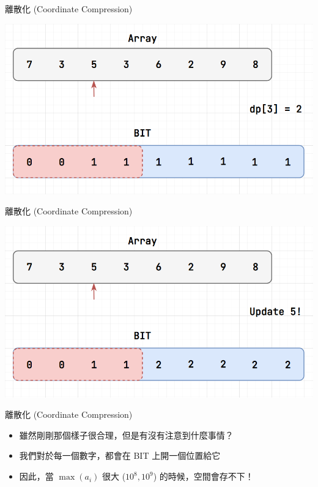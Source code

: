 \documentclass[aspectratio=169]{beamer}
\begin{document}
    \begin{frame}{離散化 (Coordinate Compression)}
        \begin{center}
            \includegraphics[scale=0.45]{LIS/step8.png}
        \end{center}
    \end{frame}

    \begin{frame}{離散化 (Coordinate Compression)}
        \begin{center}
            \includegraphics[scale=0.45]{LIS/step9.png}
        \end{center}
    \end{frame}

    \begin{frame}{離散化 (Coordinate Compression)}
        \begin{itemize}
            \item 雖然剛剛那個樣子很合理，但是有沒有注意到什麼事情？
            \item<2-> 我們對於每一個數字，都會在 BIT 上開一個位置給它
            \item<3-> 因此，當 $\max(a_i)$ 很大 ($10^8, 10^9$) 的時候，空間會存不下！
        \end{itemize}
    \end{frame}
\end{document}
